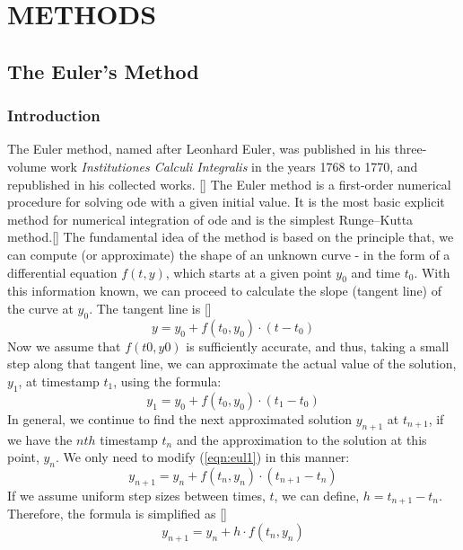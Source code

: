 \documentclass[12pt,oneside]{book}
\begin{document}
	
	\chapter{METHODS}
	\section{The Euler's Method} \label{m:eul}
		\begin{spacing}{1.2}
			
			\subsection{Introduction}
			The Euler method, named after Leonhard Euler, was published in his three-volume work \textit{Institutiones Calculi Integralis} in the years 1768 to 1770, and republished in his collected works.\citep{euler1913institutiones} [] The Euler method is a first-order numerical procedure for solving \ac{ode} with a given initial value. It is the most basic explicit method for numerical integration of \ac{ode} and is the simplest Runge–Kutta method.[] \newline
			The fundamental idea of the method is based on the principle that, we can compute (or approximate) the shape of an unknown curve - in the form of a differential equation $ f(t,y) $, which starts at a given point $ y_{0} $ and time $ t_{0} $. With this information known, we can proceed to calculate the slope (tangent line) of the curve at $ y_{0} $. \newline
			The tangent line is []
			\begin{equation*}
				y = y_{0} + f(t_{0}, y_{0}) \cdot (t - t_{0})
			\end{equation*}
			Now we assume that $ f(t0, y0) $ is sufficiently accurate, and thus, taking a small step along that tangent line, we can approximate the actual value of the solution, $ y_{1} $, at timestamp $ t_{1} $, using the formula:
			\begin{equation} \label{eqn:eul1}
				y_{1} = y_{0} + f(t_{0}, y_{0}) \cdot (t_{1} - t_{0})
			\end{equation}
			In general, we continue to find the next approximated solution $ y_{n+1} $ at $ t_{n+1} $, if we have the $ nth $ timestamp $ t_{n} $ and the approximation to the solution at this point, $ y_{n} $. We only need to modify (\ref{eqn:eul1}) in this manner:
			\begin{equation} \tag{2.2a}
				y_{n+1} = y_{n} + f(t_{n}, y_{n}) \cdot (t_{n+1} - t_{n})
			\end{equation}
			If we assume uniform step sizes between times, $ t $, we can define, $ h = t_{n+1} - t_{n} $. Therefore, the formula is simplified as []
			\begin{equation} \label{eqn:eul} \tag{2.2b}
				y_{n+1} = y_{n} + h \cdot f(t_{n}, y_{n})
			\end{equation}
			

\end{spacing}
\end{document}
